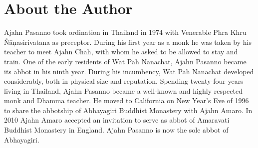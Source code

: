 \chapter{About the Author}

Ajahn Pasanno took ordination in Thailand in 1974 with Venerable Phra
Khru Ñāṇasirivatana as preceptor. During his first year as a monk he was
taken by his teacher to meet Ajahn Chah, with whom he asked to be
allowed to stay and train. One of the early residents of Wat Pah
Nanachat, Ajahn Pasanno became its abbot in his ninth year. During his
incumbency, Wat Pah Nanachat developed considerably, both in physical
size and reputation. Spending twenty-four years living in Thailand,
Ajahn Pasanno became a well-known and highly respected monk and Dhamma
teacher. He moved to California on New Year’s Eve of 1996 to share the
abbotship of Abhayagiri Buddhist Monastery with Ajahn Amaro. In 2010
Ajahn Amaro accepted an invitation to serve as abbot of Amaravati
Buddhist Monastery in England. Ajahn Pasanno is now the sole abbot of
Abhayagiri.
